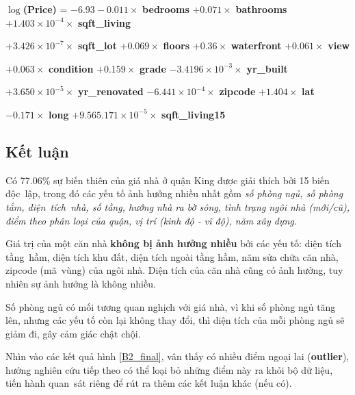 \noindent $\log$\textbf{(Price)} = $-6.93 -0.011 \times$ \textbf{bedrooms} $+0.071\times$ \textbf{bathrooms} $+1.403\times 10^{-4} \times$ \textbf{sqft\_living}

\hspace{1.5cm} $+ 3.426\times10^{-7}\times$ \textbf{sqft\_lot} $+ 0.069\times$ \textbf{floors} $+ 0.36\times$ \textbf{waterfront} $+ 0.061\times$ \textbf{view}

\hspace{1.5cm}  $+ 0.063\times$ \textbf{condition} $+ 0.159\times$ \textbf{grade} $- 3.4196\times 10^{-3}\times$ \textbf{yr\_built}

\hspace{1.5cm} $+ 3.650\times 10^{-5}\times$ \textbf{yr\_renovated} $- 6.441 \times 10^{-4}\times$ \textbf{zipcode} $+ 1.404\times$ \textbf{lat}


\hspace{1.5cm}  $- 0.171\times$ \textbf{long} $+ 9.565.171\times 10^{-5}\times$ \textbf{sqft\_living15}

\subsection*{Kết luận}

Có 77.06\% sự biến thiên của giá nhà ở quận King được giải thích bởi 15 biến độc~lập, trong đó các yếu tố ảnh hưởng nhiều nhất gồm \textit{số phòng ngủ, số phòng tắm, diện~tích~nhà, số tầng, hướng nhà ra bờ sông, tình trạng ngôi nhà (mới/cũ), điểm theo phân loại của quận, vị trí (kinh độ - vĩ độ), năm xây dựng}.

Giá trị của một căn nhà \textbf{không bị ảnh hưởng nhiều} bởi các yếu tố: diện tích tầng~hầm, diện tích khu đất, diện tích ngoài tầng hầm, năm sửa chữa căn nhà, zipcode (mã~vùng) của ngôi nhà. Diện tích của căn nhà cũng có ảnh hưởng, tuy nhiên sự ảnh hưởng là không nhiều.

Số phòng ngủ có mối tương quan nghịch với giá nhà, vì khi số phòng ngủ tăng lên, nhưng các yếu tố còn lại không thay đổi, thì diện tích của mỗi phòng ngủ sẽ giảm đi, gây cảm giác chật chội. 

Nhìn vào các kết quả hình \ref{B2_final}, vân thấy có nhiều điểm ngoại lai (\textbf{outlier}), hướng nghiên cứu tiếp theo có thể loại bỏ những điểm này ra khỏi bộ dữ liệu, tiến hành quan~sát riêng để rút ra thêm các kết luận khác (nếu có).